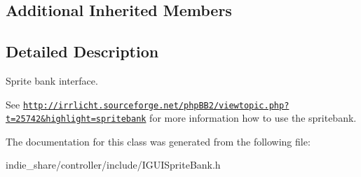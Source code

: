 \subsection*{Additional Inherited Members}


\subsection{Detailed Description}
Sprite bank interface. 

See \href{http://irrlicht.sourceforge.net/phpBB2/viewtopic.php?t=25742&highlight=spritebank}{\tt http\+://irrlicht.\+sourceforge.\+net/php\+B\+B2/viewtopic.\+php?t=25742\&highlight=spritebank} for more information how to use the spritebank. 

The documentation for this class was generated from the following file\+:\begin{DoxyCompactItemize}
\item 
indie\+\_\+share/controller/include/I\+G\+U\+I\+Sprite\+Bank.\+h\end{DoxyCompactItemize}
